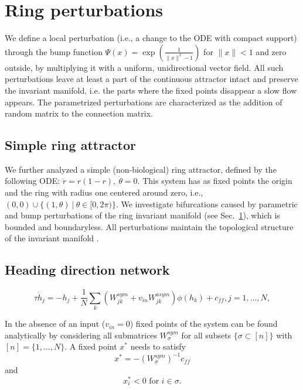 \documentclass{article} %
\newcounter{ct}
\theoremstyle{definition}
\theoremstyle{remark}
\begin{document}
\newpage
\section{Ring perturbations}\label{sec:supp:ring_perturbations}

We define a local perturbation (i.e., a change to the ODE with compact support) through the bump function $\Psi(x) = \exp\left(\frac{1}{\|x\|^2-1}\right)$ for $\|x\|<1$ and zero outside, by multiplying it with a uniform, unidirectional vector field. All such perturbations leave at least a part of the continuous attractor intact and preserve the invariant manifold, i.e. the parts where the fixed points disappear a slow flow appears.
The parametrized perturbations are characterized as the addition of random matrix to the connection matrix. 



\subsection{Simple ring attractor}
We further analyzed a simple (non-biological)  ring attractor, defined by the following ODE: $\dot r = r(1-r), \ \dot \theta = 0.$
This system has as fixed points the origin and the ring with radius one centered around zero, i.e., $(0,0)\cup\{(1,\theta)\ |\ \theta\in[0,2\pi)\}$.
We investigate bifurcations caused by parametric and bump perturbations of the ring invariant manifold (see Sec.~\ref{sec:supp:ring_perturbations}), which is bounded and boundaryless.
All perturbations maintain the topological structure of the invariant manifold . %

\subsection{Heading direction network}\label{sec:supp:headdirection}

\begin{equation}
\tau \dot h_j = -h_j + \frac{1}{N} \sum_k (W^{sym}_{jk} + v_{in} W^{asym}_{jk})\phi(h_k)+c_{ff},     j=1,\dots,N,
\end{equation}

In the absence of an input ($v_{in}=0$) fixed points of the system can be found analytically by considering all submatrices $W^{sym}_\sigma$ for all subsets $\{\sigma\subset [n]\}$ with$[n]=\{1,\dots, N\}$.
A fixed point $x^*$ needs to satisfy
\begin{equation}
x^*= -(W^{sym}_\sigma)^{-1}c_{ff}
\end{equation}
and 
\begin{equation}
x^*_i<0 \text{   for  	 } i\in\sigma.
\end{equation}
\end{document}
